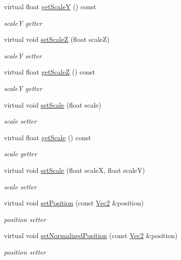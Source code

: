 \begin{Indent}
\begin{DoxyCompactItemize}
virtual float \hyperlink{classNode_ab87661ab8940512baf2e7639ea55ff87}{get\+ScaleY} () const
\begin{DoxyCompactList}\small\item\em scaleY getter \end{DoxyCompactList}\item 
virtual void \hyperlink{classNode_a79518b90226335e0997552687eb7b33f}{set\+ScaleZ} (float scaleZ)
\begin{DoxyCompactList}\small\item\em scaleY setter \end{DoxyCompactList}\item 
virtual float \hyperlink{classNode_a0b55ddbe04d126953e1db8606d9a9ecd}{get\+ScaleZ} () const
\begin{DoxyCompactList}\small\item\em scaleY getter \end{DoxyCompactList}\item 
virtual void \hyperlink{classNode_acf0955a52f51a9d6c8b0c9267b1e8668}{set\+Scale} (float scale)
\begin{DoxyCompactList}\small\item\em scale setter \end{DoxyCompactList}\item 
virtual float \hyperlink{classNode_ac9926440d4edab1020d348a2b950307c}{get\+Scale} () const
\begin{DoxyCompactList}\small\item\em scale getter \end{DoxyCompactList}\item 
virtual void \hyperlink{classNode_a31f8130cfd505a5c327c4cc66fe4fa69}{set\+Scale} (float scaleX, float scaleY)
\begin{DoxyCompactList}\small\item\em scale setter \end{DoxyCompactList}\item 
virtual void \hyperlink{classNode_a8ffbf25763ef5f15eeae7227779505bc}{set\+Position} (const \hyperlink{classVec2}{Vec2} \&position)
\begin{DoxyCompactList}\small\item\em position setter \end{DoxyCompactList}\item 
virtual void \hyperlink{classNode_a3665662090ae9ebd3820ee4e7199da7b}{set\+Normalized\+Position} (const \hyperlink{classVec2}{Vec2} \&position)
\begin{DoxyCompactList}\small\item\em position setter \end{DoxyCompactList}\item 

\end{DoxyCompactItemize}
\end{Indent}
